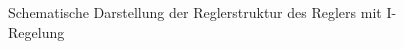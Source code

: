 \documentclass[
	pagesize,
	fontsize=12pt,
	paper=a4,
	oneside,
   reqno
]{scrartcl}
\begin{document}
\begin{figure}[H]
    \centering
    \caption[Reglerstruktur I-Regelung]{Schematische Darstellung der Reglerstruktur des Reglers mit I-Regelung}
    \label{fig:Bild9}
\end{figure}
\end{document}
